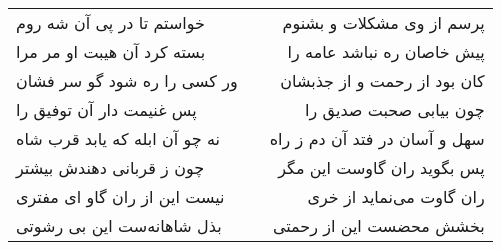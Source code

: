 \begin{center}
\begin{longtable}{l p{0.5cm} r}
خواستم تا در پی آن شه روم
&&
پرسم از وی مشکلات و بشنوم
\\
بسته کرد آن هیبت او مر مرا
&&
پیش خاصان ره نباشد عامه را
\\
ور کسی را ره شود گو سر فشان
&&
کان بود از رحمت و از جذبشان
\\
پس غنیمت دار آن توفیق را
&&
چون بیابی صحبت صدیق را
\\
نه چو آن ابله که یابد قرب شاه
&&
سهل و آسان در فتد آن دم ز راه
\\
چون ز قربانی دهندش بیشتر
&&
پس بگوید ران گاوست این مگر
\\
نیست این از ران گاو ای مفتری
&&
ران گاوت می‌نماید از خری
\\
بذل شاهانه‌ست این بی رشوتی
&&
بخشش محضست این از رحمتی
\\
\end{longtable}
\end{center}
